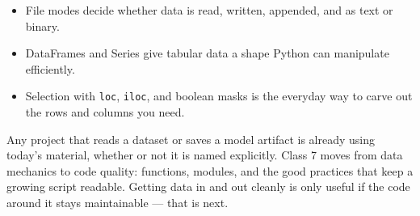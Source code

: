\classclosingframe
{\begin{itemize}
\item File modes decide whether data is read, written, appended, and as text or binary.
\item DataFrames and Series give tabular data a shape Python can manipulate efficiently.
\item Selection with \texttt{loc}, \texttt{iloc}, and boolean masks is the everyday way to carve out the rows and columns you need.
\end{itemize}}
{Any project that reads a dataset or saves a model artifact is already using today's material, whether or not it is named explicitly.}
{Class 7 moves from data mechanics to code quality: functions, modules, and the good practices that keep a growing script readable.}
{Getting data in and out cleanly is only useful if the code around it stays maintainable --- that is next.}


